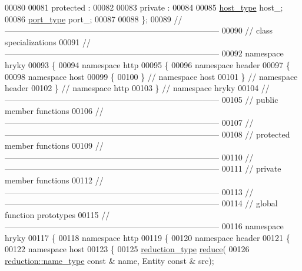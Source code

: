 \begin{DoxyCode}
00080 
00081 \textcolor{keyword}{protected} :
00082 
00083 \textcolor{keyword}{private} :
00084 
00085     \hyperlink{classhryky_1_1uri_1_1host_1_1_entity}{host_type} host\_;
00086     \hyperlink{classhryky_1_1uri_1_1port_1_1_entity}{port_type} port\_;
00087 
00088 \};
00089 \textcolor{comment}{//
      ------------------------------------------------------------------------------}
00090 \textcolor{comment}{// class specializations}
00091 \textcolor{comment}{//
      ------------------------------------------------------------------------------}
00092 \textcolor{keyword}{namespace }hryky
00093 \{
00094 \textcolor{keyword}{namespace }http
00095 \{
00096 \textcolor{keyword}{namespace }header
00097 \{
00098 \textcolor{keyword}{namespace }host
00099 \{
00100 \} \textcolor{comment}{// namespace host}
00101 \} \textcolor{comment}{// namespace header}
00102 \} \textcolor{comment}{// namespace http}
00103 \} \textcolor{comment}{// namespace hryky}
00104 \textcolor{comment}{//
      ------------------------------------------------------------------------------}
00105 \textcolor{comment}{// public member functions}
00106 \textcolor{comment}{//
      ------------------------------------------------------------------------------}
00107 \textcolor{comment}{//
      ------------------------------------------------------------------------------}
00108 \textcolor{comment}{// protected member functions}
00109 \textcolor{comment}{//
      ------------------------------------------------------------------------------}
00110 \textcolor{comment}{//
      ------------------------------------------------------------------------------}
00111 \textcolor{comment}{// private member functions}
00112 \textcolor{comment}{//
      ------------------------------------------------------------------------------}
00113 \textcolor{comment}{//
      ------------------------------------------------------------------------------}
00114 \textcolor{comment}{// global function prototypes}
00115 \textcolor{comment}{//
      ------------------------------------------------------------------------------}
00116 \textcolor{keyword}{namespace }hryky
00117 \{
00118 \textcolor{keyword}{namespace }http
00119 \{
00120 \textcolor{keyword}{namespace }header
00121 \{
00122 \textcolor{keyword}{namespace }host
00123 \{
00125     \hyperlink{namespacehryky_a343a9a4c36a586be5c2693156200eadc}{reduction_type} \hyperlink{namespacehryky_1_1http_a08fc36a78a8e2908140fcd102829a566}{reduce}(
00126         \hyperlink{namespacehryky_1_1reduction_ac686c30a4c8d196bbd0f05629a6b921f}{reduction::name_type} \textcolor{keyword}{const} & name, Entity \textcolor{keyword}{const} & src);

\end{DoxyCode}
